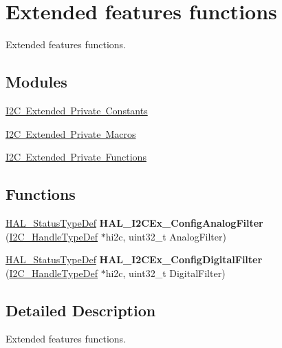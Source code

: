 \hypertarget{group___i2_c_ex___exported___functions___group1}{}\section{Extended features functions}
\label{group___i2_c_ex___exported___functions___group1}


Extended features functions.  


\subsection*{Modules}
\begin{DoxyCompactItemize}
\item 
\mbox{\hyperlink{group___i2_c_ex___private___constants}{I2\+C Extended Private Constants}}
\item 
\mbox{\hyperlink{group___i2_c_ex___private___macro}{I2\+C Extended Private Macros}}
\item 
\mbox{\hyperlink{group___i2_c_ex___private___functions}{I2\+C Extended Private Functions}}
\end{DoxyCompactItemize}
\subsection*{Functions}
\begin{DoxyCompactItemize}
\item 
\mbox{\label{group___i2_c_ex___exported___functions___group1_ga2f0b5fc42fca412214f3968e528e2b9e}} 
\mbox{\hyperlink{stm32f7xx__hal__def_8h_a63c0679d1cb8b8c684fbb0632743478f}{H\+A\+L\+\_\+\+Status\+Type\+Def}} {\bfseries H\+A\+L\+\_\+\+I2\+C\+Ex\+\_\+\+Config\+Analog\+Filter} (\mbox{\hyperlink{struct_____i2_c___handle_type_def}{I2\+C\+\_\+\+Handle\+Type\+Def}} $\ast$hi2c, uint32\+\_\+t Analog\+Filter)
\item 
\mbox{\label{group___i2_c_ex___exported___functions___group1_ga474acc9b92626a0f690bf9aa8991a476}} 
\mbox{\hyperlink{stm32f7xx__hal__def_8h_a63c0679d1cb8b8c684fbb0632743478f}{H\+A\+L\+\_\+\+Status\+Type\+Def}} {\bfseries H\+A\+L\+\_\+\+I2\+C\+Ex\+\_\+\+Config\+Digital\+Filter} (\mbox{\hyperlink{struct_____i2_c___handle_type_def}{I2\+C\+\_\+\+Handle\+Type\+Def}} $\ast$hi2c, uint32\+\_\+t Digital\+Filter)
\end{DoxyCompactItemize}


\subsection{Detailed Description}
Extended features functions. 

